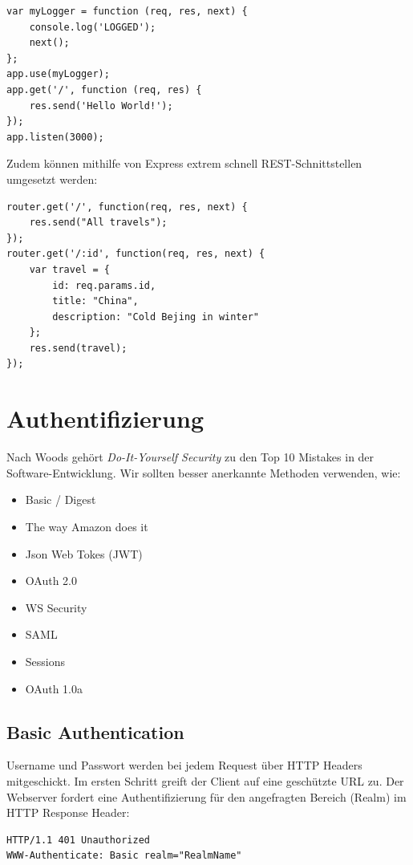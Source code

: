 \begin{lstlisting}[caption=Loggen jedes Requests]
var myLogger = function (req, res, next) {
	console.log('LOGGED');
	next();
};
app.use(myLogger);
app.get('/', function (req, res) {
	res.send('Hello World!');
});
app.listen(3000);
\end{lstlisting}

Zudem können mithilfe von Express extrem schnell REST-Schnittstellen umgesetzt werden:

\begin{lstlisting}[caption=REST mit Express]
router.get('/', function(req, res, next) {
	res.send("All travels");
});
router.get('/:id', function(req, res, next) {
	var travel = {
		id: req.params.id,
		title: "China",
		description: "Cold Bejing in winter"
	};
	res.send(travel);
});
\end{lstlisting}

\section{Authentifizierung}

Nach Woods gehört \textit{Do-It-Yourself Security} zu den Top 10 Mistakes in der Software-Entwicklung. Wir sollten besser anerkannte Methoden verwenden, wie:
\begin{itemize}
	\item Basic / Digest
	\item The way Amazon does it
	\item Json Web Tokes (JWT)
	\item OAuth 2.0
	\item WS Security
	\item SAML
	\item Sessions
	\item OAuth 1.0a
\end{itemize}

\subsection{Basic Authentication}
Username und Passwort werden bei jedem Request über HTTP Headers mitgeschickt. Im ersten Schritt greift der Client auf eine geschützte URL zu. Der Webserver fordert eine Authentifizierung für den angefragten Bereich (Realm) im HTTP Response Header:

\begin{lstlisting}[caption=HTTP Response Header]
HTTP/1.1 401 Unauthorized
WWW-Authenticate: Basic realm="RealmName"
\end{lstlisting}

